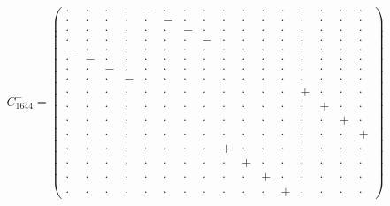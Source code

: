 \documentclass[
  10pt,
]{article}
\begin{document}
\[C^-_{1644}=\left(\begin{smallmatrix} \cdot & \cdot & \cdot & \cdot & - & \cdot & \cdot & \cdot & \cdot & \cdot & \cdot & \cdot & \cdot & \cdot & \cdot & \cdot \\ \cdot & \cdot & \cdot & \cdot & \cdot & - & \cdot & \cdot & \cdot & \cdot & \cdot & \cdot & \cdot & \cdot & \cdot & \cdot \\ \cdot & \cdot & \cdot & \cdot & \cdot & \cdot & - & \cdot & \cdot & \cdot & \cdot & \cdot & \cdot & \cdot & \cdot & \cdot \\ \cdot & \cdot & \cdot & \cdot & \cdot & \cdot & \cdot & - & \cdot & \cdot & \cdot & \cdot & \cdot & \cdot & \cdot & \cdot \\ - & \cdot & \cdot & \cdot & \cdot & \cdot & \cdot & \cdot & \cdot & \cdot & \cdot & \cdot & \cdot & \cdot & \cdot & \cdot \\ \cdot & - & \cdot & \cdot & \cdot & \cdot & \cdot & \cdot & \cdot & \cdot & \cdot & \cdot & \cdot & \cdot & \cdot & \cdot \\ \cdot & \cdot & - & \cdot & \cdot & \cdot & \cdot & \cdot & \cdot & \cdot & \cdot & \cdot & \cdot & \cdot & \cdot & \cdot \\ \cdot & \cdot & \cdot & - & \cdot & \cdot & \cdot & \cdot & \cdot & \cdot & \cdot & \cdot & \cdot & \cdot & \cdot & \cdot \\ \cdot & \cdot & \cdot & \cdot & \cdot & \cdot & \cdot & \cdot & \cdot & \cdot & \cdot & \cdot & + & \cdot & \cdot & \cdot \\ \cdot & \cdot & \cdot & \cdot & \cdot & \cdot & \cdot & \cdot & \cdot & \cdot & \cdot & \cdot & \cdot & + & \cdot & \cdot \\ \cdot & \cdot & \cdot & \cdot & \cdot & \cdot & \cdot & \cdot & \cdot & \cdot & \cdot & \cdot & \cdot & \cdot & + & \cdot \\ \cdot & \cdot & \cdot & \cdot & \cdot & \cdot & \cdot & \cdot & \cdot & \cdot & \cdot & \cdot & \cdot & \cdot & \cdot & + \\ \cdot & \cdot & \cdot & \cdot & \cdot & \cdot & \cdot & \cdot & + & \cdot & \cdot & \cdot & \cdot & \cdot & \cdot & \cdot \\ \cdot & \cdot & \cdot & \cdot & \cdot & \cdot & \cdot & \cdot & \cdot & + & \cdot & \cdot & \cdot & \cdot & \cdot & \cdot \\ \cdot & \cdot & \cdot & \cdot & \cdot & \cdot & \cdot & \cdot & \cdot & \cdot & + & \cdot & \cdot & \cdot & \cdot & \cdot \\ \cdot & \cdot & \cdot & \cdot & \cdot & \cdot & \cdot & \cdot & \cdot & \cdot & \cdot & + & \cdot & \cdot & \cdot & \cdot \end{smallmatrix}\right)\]
\end{document}
